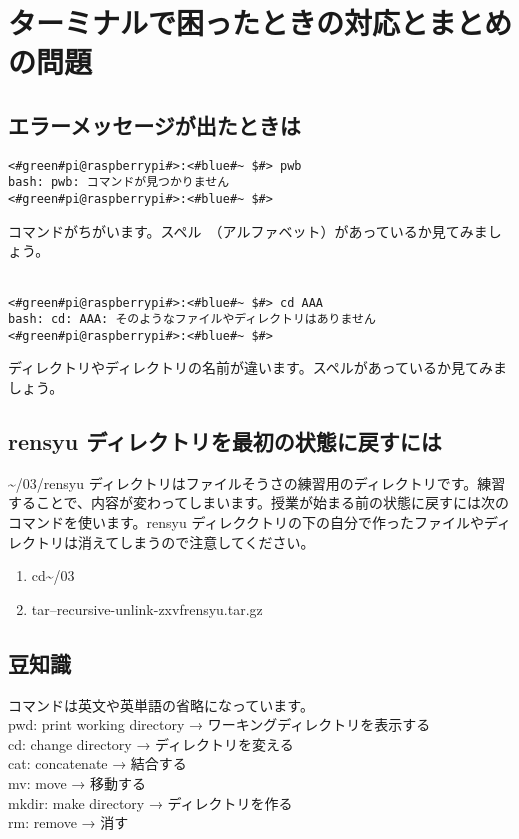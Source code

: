 \section{ターミナルで困ったときの対応とまとめの問題}

\subsection{エラーメッセージが出たときは}
\begin{lstlisting}[caption=コマンドがちがうときの例, label=cmdMiss]
<#green#pi@raspberrypi#>:<#blue#~ $#> pwb
bash: pwb: コマンドが見つかりません
<#green#pi@raspberrypi#>:<#blue#~ $#> 
\end{lstlisting}
コマンドがちがいます。スペル　（アルファベット）があっているか見てみましょう。\\\\

\begin{lstlisting}[caption=ディレクトリやファイルの名前がちがうときの例, label=nameMiss]
<#green#pi@raspberrypi#>:<#blue#~ $#> cd AAA
bash: cd: AAA: そのようなファイルやディレクトリはありません
<#green#pi@raspberrypi#>:<#blue#~ $#> 
\end{lstlisting}
ディレクトリやディレクトリの名前が違います。スペルがあっているか見てみましょう。\\


\subsection{rensyu ディレクトリを最初の状態に戻すには}
\textasciitilde /03/rensyu ディレクトリはファイルそうさの練習用のディレクトリです。練習することで、内容が変わってしまいます。授業が始まる前の状態に戻すには次のコマンドを使います。rensyu ディレククトリの下の自分で作ったファイルやディレクトリは消えてしまうので注意してください。\\
\begin{enumerate}
\item  cd\textvisiblespace \textasciitilde /03
\item  tar\textvisiblespace --recursive-unlink\textvisiblespace -zxvf\textvisiblespace rensyu.tar.gz
\end{enumerate}

\subsection{豆知識}
\label{英語と日本語の対応表}
コマンドは英文や英単語の省略になっています。\\
pwd: print working directory → ワーキングディレクトリを表示する\\
cd: change directory → ディレクトリを変える\\
cat: concatenate → 結合する\\
mv: move → 移動する\\
mkdir: make directory → ディレクトリを作る\\
rm: remove → 消す\\
